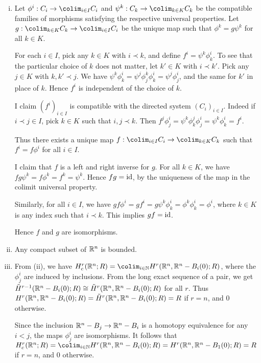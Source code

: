 \documentclass{article}
\begin{document}
 \begin{enumerate}[i.]
\item Let $\phi^i: C_i \to \colim_{i \in I} C_i$ and $\psi^k: C_k \to \colim_{k \in K} C_k$ be the compatible families of morphisms satisfying the respective universal properties. Let $g: \colim_{k \in K} C_k \to \colim_{i \in I} C_i$ be the unique map such that $\phi^k = g \psi^k$ for all $k \in K$.

For each $i \in I$, pick any $k \in K$ with $i \prec k$, and define $f^i = \psi^{k} \phi^i_{k}$. To see that the particular choice of $k$ does not matter, let $k' \in K$ with $i \prec k'$. Pick any $j \in K$ with $k, k' \prec j$.  We have $\psi^{k} \phi^i_{k} = \psi^j \phi^k_j \phi^i_k = \psi^j \phi^i_j$, and the same for $k'$ in place of $k$. Hence $f^i$ is independent of the choice of $k$.

I claim $(f^i)_{i\in I}$ is compatible with the directed system $(C_i)_{i \in I}$. Indeed if $i \prec j \in I$, pick $k \in K$ such that $i,j \prec k$. Then  $f^j \phi^i_j = \psi^k \phi^j_k \phi^i_j = \psi^k \phi^i_k = f^i$.

Thus there exists a unique map $f: \colim_{i \in I} C_i \to \colim_{k \in K} C_k$ such that $f^i = f \phi^i$ for all $i \in I$.

I claim that $f$ is a left and right inverse for $g$.  For all $k \in K$, we have $fg \psi^k = f \phi^k = f^k = \psi^k$. Hence $fg = \operatorname{id}$, by the uniqueness of the map in the colimit universal property.  

Similarly, for all $i \in I$, we have $gf \phi^i = g f^i = g \psi^k \phi^i_k = \phi^k \phi^i_k = \phi^i$, where $k \in K$ is any index such that $i \prec k$. This implies $gf = \operatorname{id}$.  

Hence $f$ and $g$ are isomorphisms.

\item Any compact subset of $\mathbb{R}^n$ is bounded.

\item From (ii), we have $H^r_c(\R^n; R) = \colim_{i \in \N} H^r(\R^n, \R^n - B_i(0); R)$, where the $\phi^i_j$ are induced by inclusions. From the long exact sequence of a pair, we get $\tilde H^{r-1}(\mathbb{R}^n - B_i(0); R) \cong \tilde H^r(\mathbb{R}^n, \mathbb{R}^n - B_i(0); R)$ for all $r$.  Thus $H^r(\mathbb{R}^n, \mathbb{R}^n - B_i(0); R) = \tilde  H^r(\mathbb{R}^n, \mathbb{R}^n - B_i(0); R) = R$ if $r = n$, and $0$ otherwise.

Since the inclusion $\mathbb{R}^n - B_j \to \mathbb{R}^n - B_i$ is a homotopy equivalence for any $i < j$, the maps $\phi^i_j$ are isomorphisms. It follows that $H^r_c(\R^n; R) = \colim_{i \in \N} H^r(\R^n, \R^n - B_i(0); R) = H^r(\R^n, \R^n - B_1(0); R) = R$ if $r = n$, and $0$ otherwise.
\end{enumerate}
\end{document}
